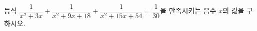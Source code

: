 등식 $\dfrac{1}{x^2+3x}+\dfrac{1}{x^2+9x+18}+\dfrac{1}{x^2+15x+54}=\dfrac{1}{30}$을 만족시키는 음수 $x$의 값을 구하시오.
